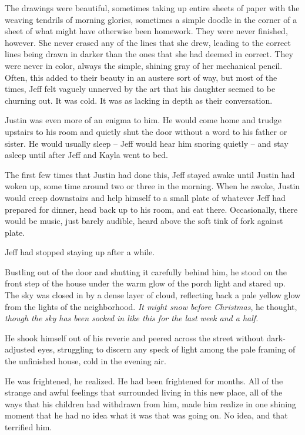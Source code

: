 The drawings were beautiful, sometimes taking up entire sheets of paper with the weaving tendrils of morning glories, sometimes a simple doodle in the corner of a sheet of what might have otherwise been homework.  They were never finished, however.  She never erased any of the lines that she drew, leading to the correct lines being drawn in darker than the ones that she had deemed in correct.  They were never in color, always the simple, shining gray of her mechanical pencil.  Often, this added to their beauty in an austere sort of way, but most of the times, Jeff felt vaguely unnerved by the art that his daughter seemed to be churning out.  It was cold.  It was as lacking in depth as their conversation.

Justin was even more of an enigma to him.  He would come home and trudge upstairs to his room and quietly shut the door without a word to his father or sister.  He would usually sleep -- Jeff would hear him snoring quietly -- and stay asleep until after Jeff and Kayla went to bed.

The first few times that Justin had done this, Jeff stayed awake until Justin had woken up, some time around two or three in the morning.  When he awoke, Justin would creep downstairs and help himself to a small plate of whatever Jeff had prepared for dinner, head back up to his room, and eat there.  Occasionally, there would be music, just barely audible, heard above the soft tink of fork against plate.

Jeff had stopped staying up after a while.

\secdiv


Bustling out of the door and shutting it carefully behind him, he stood on the front step of the house under the warm glow of the porch light and stared up.  The sky was closed in by a dense layer of cloud, reflecting back a pale yellow glow from the lights of the neighborhood.  \textit{It might snow before Christmas}, he thought, \textit{though the sky has been socked in like this for the last week and a half.}

He shook himself out of his reverie and peered across the street without dark-adjusted eyes, struggling to discern any speck of light among the pale framing of the unfinished house, cold in the evening air.

He was frightened, he realized.  He had been frightened for months.  All of the strange and awful feelings that surrounded living in this new place, all of the ways that his children had withdrawn from him, made him realize in one shining moment that he had no idea what it was that was going on.  No idea, and that terrified him.


